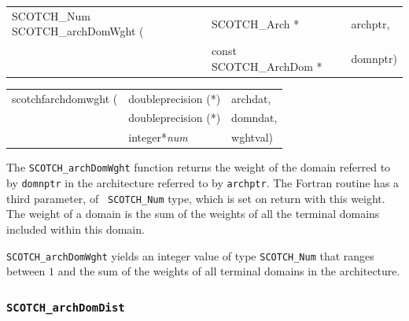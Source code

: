 \begin{itemize}
\progsyn

{\tt\begin{tabular}{l@{}ll}
SCOTCH\_Num SCOTCH\_archDomWght ( & SCOTCH\_Arch *          & archptr, \\
                                  & const SCOTCH\_ArchDom * & domnptr) \\
\end{tabular}}

{\tt\begin{tabular}{l@{}ll}
scotchfarchdomwght ( & doubleprecision (*) & archdat, \\
                     & doubleprecision (*) & domndat, \\
                     & integer*{\it num}   & wghtval)
\end{tabular}}

\progdes
The {\tt SCOTCH\_archDomWght} function returns the weight of the
domain referred to by {\tt domnptr} in the architecture referred to by
{\tt archptr}. The Fortran routine has a third parameter, of {\tt
SCOTCH\_\lbt Num} type, which is set on return with this weight. The
weight of a domain is the sum of the weights of all the terminal
domains included within this domain.

\progret

{\tt SCOTCH\_archDomWght} yields an integer value of type
{\tt SCOTCH\_\lbt Num} that ranges between $1$ and the sum of the
weights of all terminal domains in the architecture.
\end{itemize}

\subsubsection{{\tt SCOTCH\_archDomDist}}

